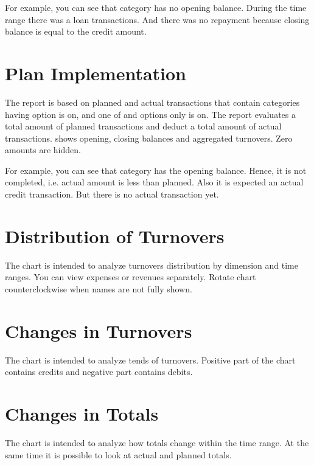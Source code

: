 \documentclass[a4paper,10pt,english]{sphinxmanual}
\begin{document}
\sphinxAtStartPar
For example, you can see that  category has no opening balance.
During the time range there was a loan transactions. And there was no repayment because
closing balance is equal to the credit amount.


\section{Plan Implementation}
\label{\detokenize{reports:plan-implementation}}
\sphinxAtStartPar
The report is based on planned and actual transactions that contain categories having
 option is on, and one of 
and  options only is on. The report evaluates a total
amount of planned transactions and deduct a total amount of actual transactions.
 shows opening,
closing balances and aggregated turnovers. Zero amounts are hidden.

\sphinxAtStartPar
For example, you can see that  category has the opening balance.
Hence, it is not completed, i.e. actual amount is less than planned.
Also it is expected an actual credit transaction. But there is no
actual transaction yet.

\noindent{}
\noindent{}
\noindent{}


\section{Distribution of Turnovers}
\label{\detokenize{reports:distribution-of-turnovers}}
\sphinxAtStartPar
The chart is intended to analyze turnovers distribution by dimension and time ranges. You can view
expenses or revenues separately. Rotate chart counterclockwise when names are not fully shown.


\section{Changes in Turnovers}
\label{\detokenize{reports:changes-in-turnovers}}
\sphinxAtStartPar
The chart is intended to analyze tends of turnovers. Positive part of the chart contains
credits and negative part contains debits.


\section{Changes in Totals}
\label{\detokenize{reports:changes-in-totals}}
\sphinxAtStartPar
The chart is intended to analyze how totals change within the time range. At the same time
it is possible to look at actual and planned totals.
\end{document}
